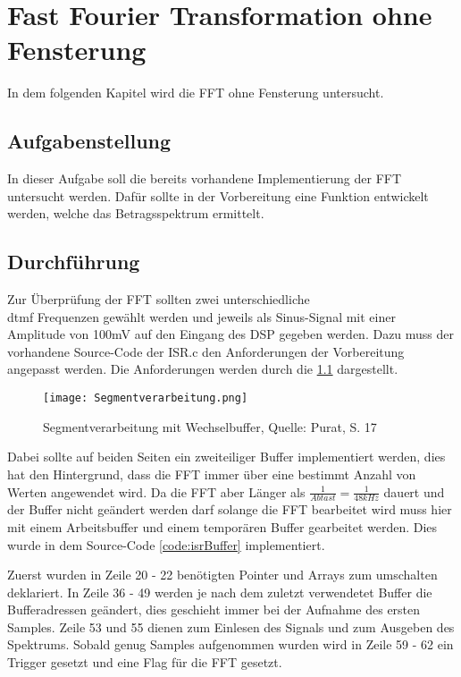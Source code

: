 \chapter{Fast Fourier Transformation ohne Fensterung}\label{CFFToF}
In dem folgenden Kapitel wird die FFT ohne Fensterung untersucht. 
\section{Aufgabenstellung}\label{TFFToF}
In dieser Aufgabe soll die bereits vorhandene Implementierung der FFT untersucht werden. Dafür sollte in der Vorbereitung eine Funktion entwickelt werden, welche das Betragsspektrum ermittelt.

\section{Durchführung}\label{DFFToF}
Zur Überprüfung der FFT sollten zwei unterschiedliche\\ \gls{dtmf} Frequenzen gewählt werden und jeweils als Sinus-Signal mit einer Amplitude von 100mV auf den Eingang des DSP gegeben werden.
Dazu muss der vorhandene Source-Code der ISR.c den Anforderungen der Vorbereitung angepasst werden.
Die Anforderungen werden durch die \cref{fig:BufferRequire} dargestellt.

\begin{figure}[H]
	\texttt{[image: Segmentverarbeitung.png]}
  \caption{Segmentverarbeitung mit Wechselbuffer, Quelle: Purat, S. 17}
  \label{fig:BufferRequire}
\end{figure}

Dabei sollte auf beiden Seiten ein zweiteiliger Buffer implementiert werden, dies hat den Hintergrund, dass die FFT immer über eine bestimmt Anzahl von Werten angewendet wird.
Da die FFT aber Länger als \begin{math}\frac{1}{Abtast} = \frac{1}{48 kHz}\end{math} dauert und der Buffer nicht geändert werden darf solange die FFT bearbeitet wird muss hier mit einem Arbeitsbuffer und einem temporären Buffer gearbeitet werden. Dies wurde in dem Source-Code \autoref{code:isrBuffer} implementiert.
\label{code:isrBuffer}

Zuerst wurden in Zeile 20 - 22 benötigten Pointer und Arrays zum umschalten deklariert.
In Zeile 36 - 49 werden je nach dem zuletzt verwendetet Buffer die Bufferadressen geändert, dies geschieht immer bei der Aufnahme des ersten Samples.
Zeile 53 und 55 dienen zum Einlesen des Signals und zum Ausgeben des Spektrums. Sobald genug Samples aufgenommen wurden wird in Zeile 59 - 62 ein Trigger gesetzt und eine Flag für die FFT gesetzt.

